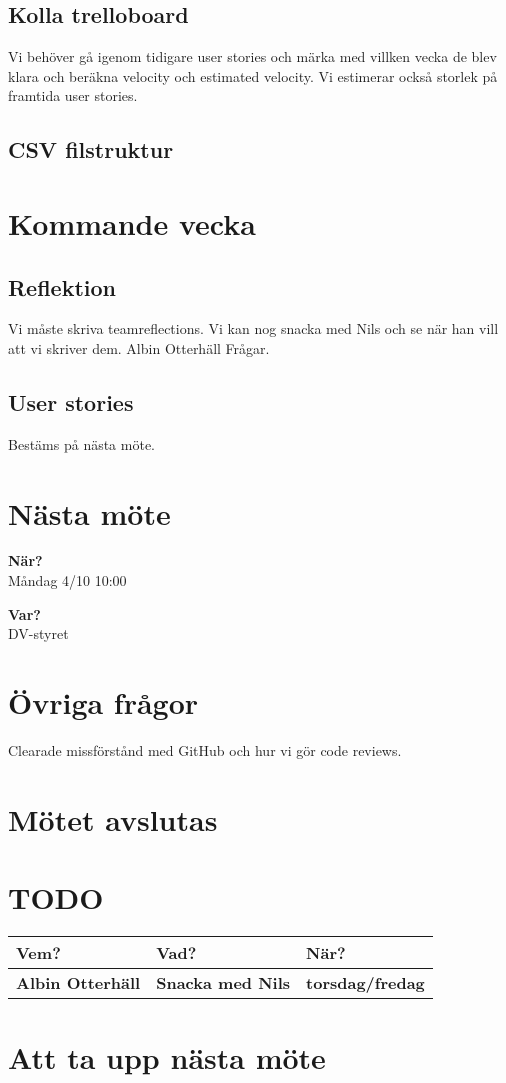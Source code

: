 \documentclass[9pt]{article}
\newcommand{\Slaget}{Albin Otterhäll\xspace}
\begin{document}
\subsection{Kolla trelloboard}
Vi behöver gå igenom tidigare user stories och märka med villken vecka de blev klara och beräkna velocity och estimated velocity. Vi estimerar också storlek på framtida user stories.

\subsection{CSV filstruktur}

\section{Kommande vecka}
\subsection{Reflektion} 
Vi måste skriva teamreflections. Vi kan nog snacka med Nils och se när han vill att vi skriver dem. \Slaget Frågar.

\subsection{User stories} 
Bestäms på nästa möte. 

\section{Nästa möte} 
\textbf{När?} \\ Måndag 4/10 10:00

\textbf{Var?} \\ DV-styret

\section{Övriga frågor}
Clearade missförstånd med GitHub och hur vi gör code reviews. 

\section{Mötet avslutas}


\appendix
\section{TODO}
\begin{tabular}{| p{3cm} | p{7.5cm} | p{3cm}|}
  \hline
  \textbf{Vem?} & \textbf{Vad?} & \textbf{När?} \\ \hline
  \textbf{\Slaget} & \textbf{Snacka med Nils} & \textbf{torsdag/fredag} \\ \hline


  \end{tabular}
\section{Att ta upp nästa möte}
\end{document}
